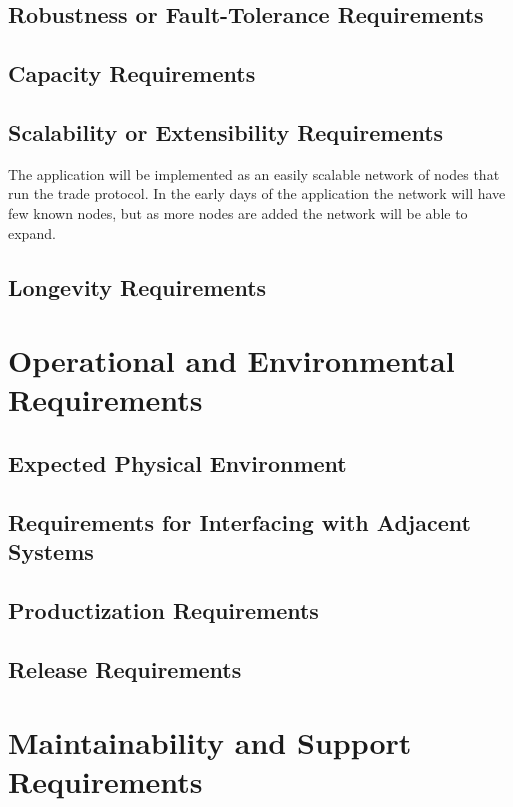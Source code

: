 \documentclass{article}
\begin{document}
\subsection{Robustness or Fault-Tolerance Requirements}


\subsection{Capacity Requirements}


\subsection{Scalability or Extensibility Requirements}
The application will be implemented as an easily scalable network of nodes that run the trade protocol. In the early days of the application the network will have few known nodes, but as more nodes are added the network will be able to expand. 

\subsection{Longevity Requirements}

\section{Operational and Environmental Requirements}

\subsection{Expected Physical Environment}


\subsection{Requirements for Interfacing with Adjacent Systems}


\subsection{Productization Requirements}


\subsection{Release Requirements}


\section{Maintainability and Support Requirements}
\end{document}
